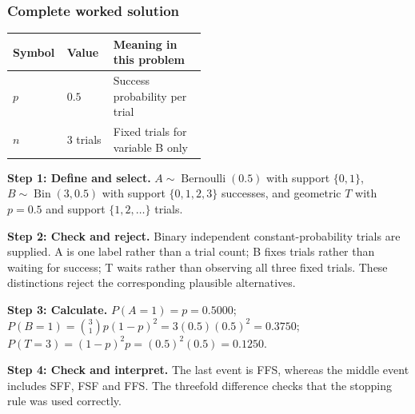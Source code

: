\subsubsection*{Complete worked solution}
\begin{center}
\begin{tabular}{llp{0.48\linewidth}}
\toprule
Symbol & Value & Meaning in this problem \\ \midrule
$p$ & $0.5$ & Success probability per trial \\
$n$ & $3$ trials & Fixed trials for variable B only \\
\bottomrule
\end{tabular}
\end{center}

\par\noindent\begin{minipage}{\linewidth}
\textbf{Step 1: Define and select.} $A\sim\operatorname{Bernoulli}(0.5)$ with support $\{0,1\}$, $B\sim\operatorname{Bin}(3,0.5)$ with support $\{0,1,2,3\}$ successes, and geometric $T$ with $p=0.5$ and support $\{1,2,\ldots\}$ trials.
\end{minipage}\par\medskip
\par\noindent\begin{minipage}{\linewidth}
\textbf{Step 2: Check and reject.} Binary independent constant-probability trials are supplied. A is one label rather than a trial count; B fixes trials rather than waiting for success; T waits rather than observing all three fixed trials. These distinctions reject the corresponding plausible alternatives.
\end{minipage}\par\medskip
\par\noindent\begin{minipage}{\linewidth}
\textbf{Step 3: Calculate.} $P(A=1)=p=0.5000$; $P(B=1)=\binom31p(1-p)^2=3(0.5)(0.5)^2=0.3750$; $P(T=3)=(1-p)^2p=(0.5)^2(0.5)=0.1250$.
\end{minipage}\par\medskip
\par\noindent\begin{minipage}{\linewidth}
\textbf{Step 4: Check and interpret.} The last event is FFS, whereas the middle event includes SFF, FSF and FFS. The threefold difference checks that the stopping rule was used correctly.
\end{minipage}\par\medskip
